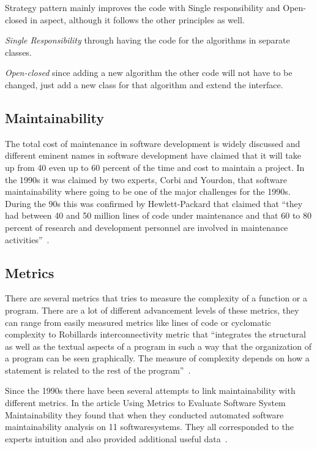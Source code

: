 \documentclass[conference, a4paper]{IEEEtran}
\begin{document}
Strategy pattern mainly improves the code with Single responsibility and Open-closed in aspect, although it follows the other principles as well.

\textit{Single Responsibility} through having the code for the algorithms in separate classes.

\textit{Open-closed} since adding a new algorithm the other code will not have to be changed, just add a new class for that algorithm and extend the interface.

\subsection{Maintainability}
\label{sec:Maintainability}
The total cost of maintenance in software development is widely discussed and different eminent names in software development have claimed that it will take up from 40 even up to 60 percent of the time and cost to maintain a project. In the 1990s it was claimed by two experts, Corbi and Yourdon, that software maintainability where going to be one of the major challenges for the 1990s. During the 90s this was confirmed by Hewlett-Packard that claimed that ``they had between 40 and 50 million lines of code under maintenance and that 60 to 80 percent of research and development personnel are involved in maintenance activities''~\cite{bibitem:MetricsToEvaluate}.

\subsection{Metrics}
There are several metrics that tries to measure the complexity of a function or a program. There are a lot of different advancement levels of these metrics, they can range from easily measured metrics like lines of code or cyclomatic complexity to Robillards interconnectivity metric that ``integrates the structural as well as the textual aspects of a program in such a way that the organization of a program can be seen graphically. The measure of complexity depends on how a statement is related to the rest of the program''~\cite{bibitem:Robillard}.

Since the 1990s there have been several attempts to link maintainability with different metrics. In the article Using Metrics to Evaluate Software System Maintainability they found that when they conducted automated software maintainability analysis on 11 softwaresystems. They all corresponded to the experts intuition and also provided additional useful data~\cite{bibitem:MetricsToEvaluate}.
\end{document}

